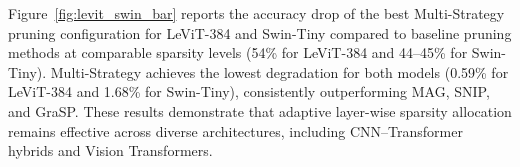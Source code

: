 \documentclass[11pt, conference]{IEEEtran}
\begin{document}
Figure~\ref{fig:levit_swin_bar} reports the accuracy drop of the best Multi-Strategy pruning configuration for LeViT-384 and Swin-Tiny compared to baseline pruning methods at comparable sparsity levels (54\% for LeViT-384 and 44--45\% for Swin-Tiny). Multi-Strategy achieves the lowest degradation for both models (0.59\% for LeViT-384 and 1.68\% for Swin-Tiny), consistently outperforming MAG, SNIP, and GraSP. These results demonstrate that adaptive layer-wise sparsity allocation remains effective across diverse architectures, including CNN–Transformer hybrids and Vision Transformers.









\end{document}
